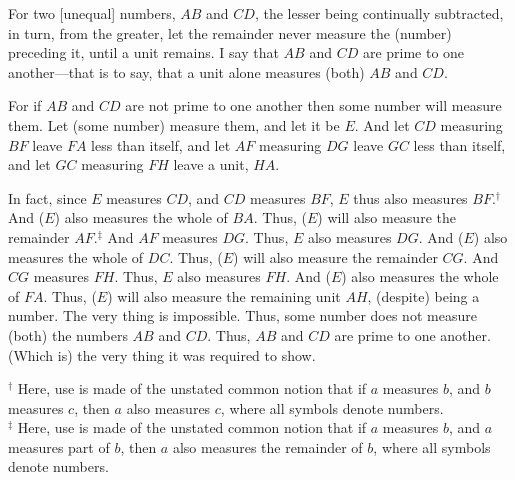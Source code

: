 \begin{Parallel}{}{}
{\epsfysize=1.8in
\centerline{}

For  two [unequal] numbers, $AB$ and $CD$, the lesser being continually
subtracted, in turn, from the greater, let the remainder never measure the (number) preceding it, until a unit remains. I say that $AB$ and
$CD$ are prime to one another---that is to say, that a unit alone measures
(both) $AB$ and $CD$.

For if $AB$ and $CD$ are not prime to one another then some number will measure
 them. Let (some number) measure  them, and let it be $E$. And let $CD$ measuring $BF$ leave $FA$
less than itself, and let $AF$ measuring $DG$ leave $GC$ less than itself, and 
let $GC$ measuring $FH$ leave a unit, $HA$.

In fact, since $E$ measures $CD$, and $CD$ measures $BF$, $E$ thus also measures
$BF$.$^\dag$ 
And ($E$) also measures the whole of $BA$. Thus, ($E$) will also measure the
remainder $AF$.$^\ddag$  And $AF$ measures $DG$. Thus, $E$ also
measures $DG$. And ($E$) also measures the whole of $DC$. Thus, ($E$) will
also measure the remainder $CG$. And $CG$ measures $FH$. Thus, $E$ also measures $FH$. And ($E$) also measures the whole of $FA$. Thus, ($E$) will also measure the remaining unit $AH$, (despite) being a number. The very thing is impossible.
Thus, some number does not measure (both) the numbers $AB$ and $CD$.
Thus, $AB$ and $CD$ are prime to one another. (Which is) the very thing it
was required to show.}
\end{Parallel}
{\footnotesize\noindent$^\dag$ Here, use is made of the unstated common notion that if
$a$ measures $b$, and $b$ measures $c$, then $a$ also measures $c$,
where all symbols denote numbers.\\[0.5ex]
$^\ddag$ Here, use is made of the unstated common notion
that if $a$ measures $b$, and $a$ measures part of $b$, then $a$
also measures the remainder of $b$, where all
symbols denote numbers.}

